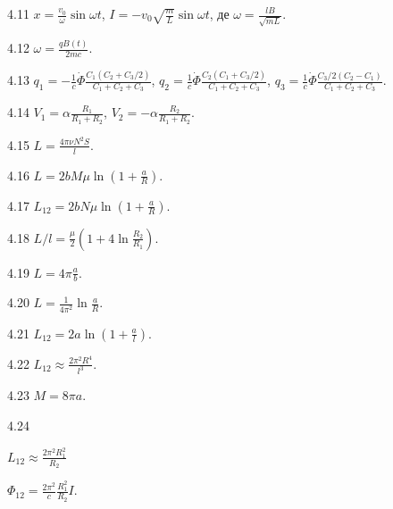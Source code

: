 \begin{Solution}{4.{11}}
	$x = \frac{v_0}{\omega}\sin\omega t$,
	$I = -v_0\sqrt{\frac{m}{L}}\sin\omega t$,
	де $\omega = \frac{lB}{\sqrt{mL}}$.
\end{Solution}
\begin{Solution}{4.{12}}
	$\omega = \frac{qB(t)}{2mc}$.
\end{Solution}
\begin{Solution}{4.{13}}
	$q_1 = - \frac1c \dot{\Phi}\frac{C_1(C_2 + C_3/2)}{C_1 + C_2 +C_3}$, $q_2 =  \frac1c \dot{\Phi}\frac{C_2(C_1 + C_3/2)}{C_1 + C_2 +C_3}$, $q_3 =  \frac1c \dot{\Phi}\frac{C_3/2(C_2 - C_1)}{C_1 + C_2 +C_3}$.
\end{Solution}
\begin{Solution}{4.{14}}
	$V_1 = \alpha \frac{R_1}{R_1 + R_2}$, $V_2 = - \alpha \frac{R_2}{R_1 + R_2}$.
\end{Solution}
\begin{Solution}{4.{15}}
	$L = \frac{4\pi\nu N^2 S}{l}$.
\end{Solution}
\begin{Solution}{4.{16}}
	$L  = 2bM\mu\ln\left( 1 + \frac{a}{R}\right) $.
\end{Solution}
\begin{Solution}{4.{17}}
	$L_{12} = 2bN\mu \ln\left( 1 + \frac{a}{R}\right) $.
\end{Solution}
\begin{Solution}{4.{18}}
	$L/l = \frac{\mu}{2} \left( 1 + 4\ln\frac{R_2}{R_1}\right)$.
\end{Solution}
\begin{Solution}{4.{19}}
	$L = 4\pi\frac{a}{b}$.
\end{Solution}
\begin{Solution}{4.{20}}
	$L = \frac{1}{4\pi^2}\ln\frac{a}{R}$.
\end{Solution}
\begin{Solution}{4.{21}}
	$L_{12} = 2a\ln\left( 1 + \frac{a}{l}\right).$
\end{Solution}
\begin{Solution}{4.{22}}
	$L_{12} \approx \frac{2\pi^2R^4}{l^3}$.
\end{Solution}
\begin{Solution}{4.{23}}
	$M = 8\pi a$.
\end{Solution}
\begin{Solution}{4.{24}}
		\begin{enumerate*}[label=\alph*)]
		\item $L_{12} \approx \frac{2\pi^2R_1^2}{R_2}$
		\item $\Phi_{12} = \frac{2\pi^2}{c} \frac{R_1^2}{R_2} I$.
		\end{enumerate*}
\end{Solution}
